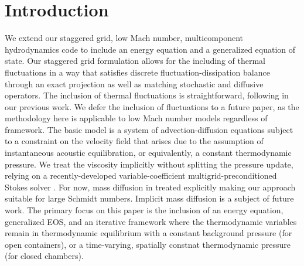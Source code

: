 \documentclass[final]{siamltex}
\begin{document}
\section{Introduction}
We extend our staggered grid, low Mach number, multicomponent hydrodynamics code
\cite{LowMachExplicit,LowMachImplicit,LowMachMulti} to include an energy
equation and a generalized equation of state.
Our staggered grid formulation allows for the including of thermal fluctuations
in a way that satisfies discrete fluctuation-dissipation balance through an
exact projection as well as matching stochastic and diffusive operators.
The inclusion of thermal fluctuations is straightforward, following in our previous work.
We defer the inclusion of fluctuations to a future paper, as
the methodology here is applicable to low Mach number models regardless of framework.
The basic model is a system of advection-diffusion equations
subject to a constraint on the velocity field that arises due to the assumption
of instantaneous acoustic equilibration, or equivalently, a constant thermodynamic
pressure.  We treat the viscosity implicitly without splitting the pressure
update, relying on a recently-developed variable-coefficient multigrid-preconditioned
Stokes solver \cite{StokesPreconditioners}.
For now, mass diffusion in treated explicitly making our
approach suitable for large Schmidt numbers.  Implicit mass diffusion is a subject
of future work.  The primary focus on this paper is the inclusion of an energy equation,
generalized EOS, and an iterative framework where the thermodynamic variables
remain in thermodynamic equilibrium with a constant background pressure (for open
containers), or a time-varying, spatially constnat thermodynamic pressure (for 
closed chambers).
\end{document}
